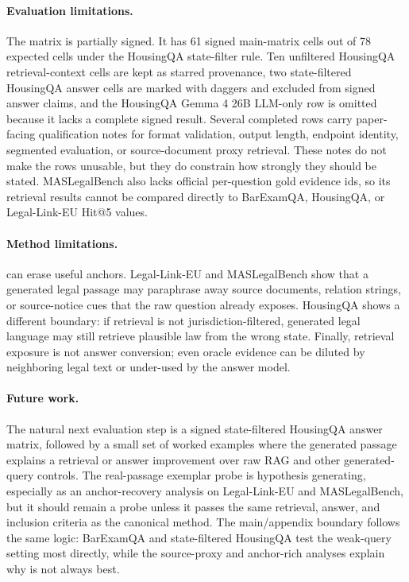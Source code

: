 \paragraph{Evaluation limitations.}
The matrix is partially signed. It has 61 signed main-matrix cells out of 78
expected cells under the HousingQA state-filter rule. Ten unfiltered HousingQA
retrieval-context cells are kept as starred provenance, two state-filtered
HousingQA answer cells are marked with daggers and excluded from signed answer
claims, and the HousingQA Gemma 4 26B LLM-only row is omitted because it lacks
a complete signed result. Several completed rows carry paper-facing qualification notes
for format validation, output length, endpoint identity, segmented evaluation,
or source-document proxy retrieval. These notes do not make the rows unusable,
but they do constrain how strongly they should be stated. MASLegalBench also
lacks official per-question gold evidence ids, so its retrieval results cannot
be compared directly to BarExamQA, HousingQA, or Legal-Link-EU Hit@5 values.

\paragraph{Method limitations.}
\hyre{} can erase useful anchors. Legal-Link-EU and MASLegalBench show that a
generated legal passage may paraphrase away source documents, relation strings,
or source-notice cues that the raw question already exposes. HousingQA shows a
different boundary: if retrieval is not jurisdiction-filtered, generated legal
language may still retrieve plausible law from the wrong state. Finally,
retrieval exposure is not answer conversion; even oracle evidence can be
diluted by neighboring legal text or under-used by the answer model.

\paragraph{Future work.}
The natural next evaluation step is a signed state-filtered HousingQA answer
matrix, followed by a small set of worked examples where the generated \hyre{}
passage explains a retrieval or answer improvement over raw RAG and other
generated-query controls. The real-passage exemplar probe is hypothesis
generating, especially as an anchor-recovery analysis on Legal-Link-EU and
MASLegalBench, but it should remain a probe unless it passes the same
retrieval, answer, and inclusion criteria as the canonical method.
The main/appendix boundary follows the same logic: BarExamQA and
state-filtered HousingQA test the weak-query setting most directly, while the
source-proxy and anchor-rich analyses explain why \hyre{} is not always best.

